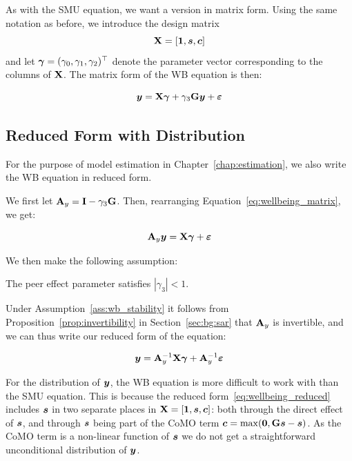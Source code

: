 As with the SMU equation, we want a version in matrix form. Using the same notation as before, we introduce the design matrix
\begin{equation}
    \mathbf{X} = [\bm{1}, \bm{s}, \bm{c}]
\end{equation}
and let $\bm{\gamma} = (\gamma_0, \gamma_1, \gamma_2)^\top$ denote the parameter vector corresponding to the columns of $\mathbf{X}$. The matrix form of the WB equation is then:

\begin{equation}
    \label{eq:wellbeing_matrix}
    \bm{y} = \mathbf{X}\bm{\gamma} + \gamma_3\mathbf{G}\bm{y} + \bm{\varepsilon}
\end{equation}

\subsection{Reduced Form with Distribution}
For the purpose of model estimation in Chapter~\ref{chap:estimation}, we also write the WB equation in reduced form.

We first let $\mathbf{A}_y = \mathbf{I} - \gamma_3\mathbf{G}$. Then, rearranging Equation~\eqref{eq:wellbeing_matrix}, we get:

\begin{equation}
    \mathbf{A}_y\bm{y} = \mathbf{X}\bm{\gamma} + \bm{\varepsilon}
\end{equation}

We then make the following assumption:

\begin{assumption}[WB Stability]
    \label{ass:wb_stability}
    The peer effect parameter satisfies $|\gamma_3| < 1$.
\end{assumption}

Under Assumption~\ref{ass:wb_stability} it follows from Proposition~\ref{prop:invertibility} in Section~\ref{sec:bg:sar} that $\mathbf{A}_y$ is invertible, and we can thus write our reduced form of the equation:

\begin{equation}
    \label{eq:wellbeing_reduced}
    \bm{y} = \mathbf{A}_y^{-1}\mathbf{X}\bm{\gamma} + \mathbf{A}_y^{-1}\bm{\varepsilon}
\end{equation}

For the distribution of $\bm{y}$, the WB equation is more difficult to work with than the SMU equation. This is because the reduced form~\eqref{eq:wellbeing_reduced} includes $\bm{s}$ in two separate places in $\mathbf{X} = [\bm{1}, \bm{s}, \bm{c}]$: both through the direct effect of $\bm{s}$, and through $\bm{s}$ being part of the CoMO term $\bm{c} = \max(\bm{0}, \mathbf{G}\bm{s} - \bm{s})$. As the CoMO term is a non-linear function of $\bm{s}$ we do not get a straightforward unconditional distribution of $\bm{y}$.


